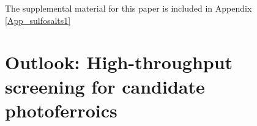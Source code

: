 \documentclass[11pt, twoside]{report}
\begin{document}

The supplemental material for this paper is included in Appendix \ref{App_sulfosalts1}






\section{Outlook: High-throughput screening for candidate photoferroics}

\end{document}
